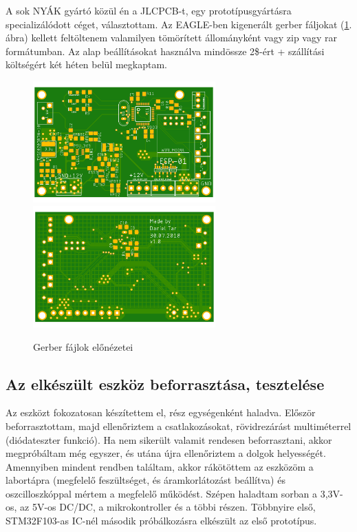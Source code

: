 \documentclass[../main.tex]{subfiles}
\begin{document}
            A sok NYÁK gyártó közül én a JLCPCB-t, egy prototípusgyártásra specializálódott céget, választottam. Az EAGLE-ben kigenerált gerber fáljokat (\ref{fig:gerber_v10}. ábra) kellett feltöltenem valamilyen tömörített állományként vagy zip vagy rar formátumban. Az alap beállításokat használva mindössze 2\$-ért + szállítási költségért két héten belül megkaptam.
            
            \begin{figure}[h!]
                \centering
                    \includegraphics[width=7cm]{resources/pcb_res/pcb_top_v10.png}
                    \includegraphics[width=7cm]{resources/pcb_res/pcb_bottom_v10.png}
                \caption{Gerber fájlok előnézetei}
                \label{fig:gerber_v10}
            \end{figure}

    \subsection{Az elkészült eszköz beforrasztása, tesztelése}
        Az eszközt fokozatosan készítettem el, rész egységenként haladva. Először beforrasztottam, majd ellenőriztem a csatlakozásokat, rövidrezárást multiméterrel (diódateszter funkció). Ha nem sikerült valamit rendesen beforrasztani, akkor megpróbáltam még egyszer, és utána újra ellenőriztem a dolgok helyességét. Amennyiben mindent rendben találtam, akkor rákötöttem az eszközöm a labortápra (megfelelő feszültséget, és áramkorlátozást beállítva) és oszcilloszkóppal mértem a megfelelő működést. Szépen haladtam sorban a 3,3V-os, az 5V-os DC/DC, a mikrokontroller és a többi részen. Többnyire első, STM32F103-as IC-nél második próbálkozásra elkészült az első prototípus. 
        
\end{document}
